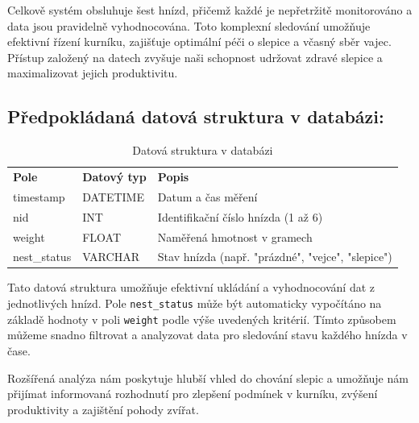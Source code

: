 Celkově systém obsluhuje šest hnízd, přičemž každé je nepřetržitě monitorováno a data jsou pravidelně vyhodnocována. Toto komplexní sledování umožňuje efektivní řízení kurníku, zajišťuje optimální péči o slepice a včasný sběr vajec. Přístup založený na datech zvyšuje naši schopnost udržovat zdravé slepice a maximalizovat jejich produktivitu.

\subsection*{Předpokládaná datová struktura v databázi:}

\begin{table}[h!]
    \centering
    \begin{tabular}{lll}
        \textbf{Pole} & \textbf{Datový typ} & \textbf{Popis}                                    \\
        timestamp     & DATETIME            & Datum a čas měření                                \\
        nid           & INT                 & Identifikační číslo hnízda (1 až 6)               \\
        weight        & FLOAT               & Naměřená hmotnost v gramech                       \\
        nest\_status  & VARCHAR             & Stav hnízda (např. "prázdné", "vejce", "slepice") \\
    \end{tabular}
    \caption{Datová struktura v databázi}
\end{table}

Tato datová struktura umožňuje efektivní ukládání a vyhodnocování dat z jednotlivých hnízd. Pole \texttt{nest\_status} může být automaticky vypočítáno na základě hodnoty v poli \texttt{weight} podle výše uvedených kritérií. Tímto způsobem můžeme snadno filtrovat a analyzovat data pro sledování stavu každého hnízda v čase.

Rozšířená analýza nám poskytuje hlubší vhled do chování slepic a umožňuje nám přijímat informovaná rozhodnutí pro zlepšení podmínek v kurníku, zvýšení produktivity a zajištění pohody zvířat.
